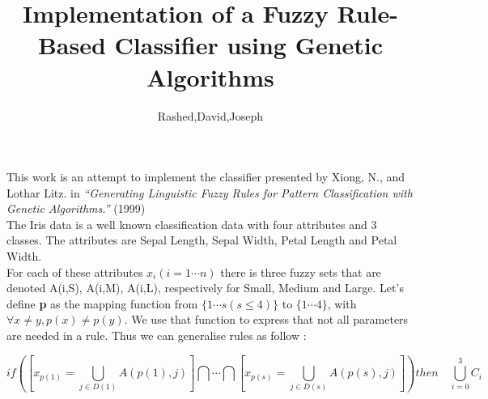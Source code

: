 \documentclass[a4paper,12pt]{article}
\begin{document}
\title{Implementation of a Fuzzy Rule-Based Classifier using Genetic Algorithms}
\author{Rashed,David,Joseph}
\maketitle


This work is an attempt to implement the classifier presented by Xiong, N., and Lothar Litz. in \textit{“Generating Linguistic Fuzzy Rules for Pattern Classification with Genetic Algorithms.”} (1999) \\
The Iris data is a well known classification data with four attributes and 3 classes. The attributes are Sepal Length, Sepal Width, Petal Length and Petal Width. \\
For each of these attributes $x_{i}(i=1\cdots n)$ there is three fuzzy sets that are denoted A(i,S), A(i,M), A(i,L), respectively for Small, Medium and Large.
Let's define \textbf{p} as the mapping function from $\{1\cdots s(s\leq4)\}$ to $\{1\cdots4\}$, with $\forall x\neq y, p(x)\neq p(y)$. We use that function to express that not all parameters are needed in a rule.
Thus we can generalise rules as follow :

\[if \left( [x_{p(1)}=\bigcup_{j\in D(1)}A(p(1),j) ] \bigcap\cdots\bigcap[x_{p(s)}=\bigcup_{j\in D(s)}A(p(s),j) ] \right) then \quad \bigcup_{i=0}^3C_i\]
\end{document}
